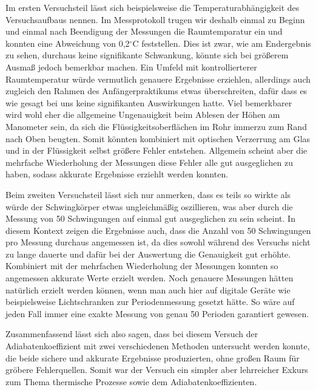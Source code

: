 \documentclass{article}
\begin{document}
Im ersten Versuchsteil lässt sich beispielsweise die Temperaturabhängigkeit des Versuchsaufbaus nennen. Im Messprotokoll trugen wir deshalb einmal zu Beginn und einmal nach Beendigung der Messungen die Raumtemparatur ein und konnten eine Abweichung von 0,2$^\circ$C feststellen. Dies ist zwar, wie am Endergebnis zu sehen, durchaus keine signifikante Schwankung, könnte sich bei größerem Ausmaß jedoch bemerkbar machen. Ein Umfeld mit kontrollierterer Raumtemperatur würde vermutlich genauere Ergebnisse erziehlen, allerdings auch zugleich den Rahmen des Anfängerpraktikums etwas überschreiten, dafür dass es wie gesagt bei uns keine signifikanten Auswirkungen hatte. Viel bemerkbarer wird wohl eher die allgemeine Ungenauigkeit beim Ablesen der Höhen am Manometer sein, da sich die Flüssigkeitsoberflächen im Rohr immerzu zum Rand nach Oben beugten. Somit könnten kombiniert mit optischen Verzerrung am Glas und in der Flüssigkeit selbst größere Fehler entstehen. Allgemein scheint aber die mehrfache Wiederholung der Messungen diese Fehler alle gut ausgeglichen zu haben, sodass akkurate Ergebnisse erziehlt werden konnten.

Beim zweiten Versuchsteil lässt sich nur anmerken, dass es teils so wirkte als würde der Schwingkörper etwas ungleichmäßig oszillieren, was aber durch die Messung von 50 Schwingungen auf einmal gut ausgeglichen zu sein scheint. In diesem Kontext zeigen die Ergebnisse auch, dass die Anzahl von 50 Schwingungen pro Messung durchaus angemessen ist, da dies sowohl während des Versuchs nicht zu lange dauerte und dafür bei der Auswertung die Genauigkeit gut erhöhte. Kombiniert mit der mehrfachen Wiederholung der Messungen konnten so angemessen akkurate Werte erzielt werden. Noch genauere Messungen hätten natürlich erzielt werden können, wenn man auch hier auf digitale Geräte wie beispielsweise Lichtschranken zur Periodenmessung gesetzt hätte. So wäre auf jeden Fall immer eine exakte Messung von genau 50 Perioden garantiert gewesen.

Zusammenfassend lässt sich also sagen, dass bei diesem Versuch der Adiabatenkoeffizient mit zwei verschiedenen Methoden untersucht werden konnte, die beide sichere und akkurate Ergebnisse produzierten, ohne großen Raum für gröbere Fehlerquellen. Somit war der Versuch ein simpler aber lehrreicher Exkurs zum Thema thermische Prozesse sowie dem Adiabatenkoeffizienten.  

\newpage

\end{document}
